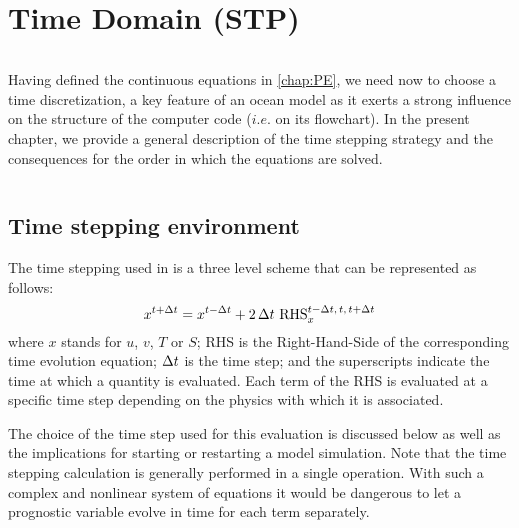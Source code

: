 \documentclass[../tex_main/NEMO_manual]{subfiles}
\begin{document}
\chapter{Time Domain (STP) }
\label{chap:STP}
\minitoc





\newpage
$\ $\newline    %


Having defined the continuous equations in \autoref{chap:PE}, we need now to choose 
a time discretization, a key feature of an ocean model as it exerts a strong influence  
on the structure of the computer code ($i.e.$ on its flowchart). 
In the present chapter, we provide a general description of the \NEMO 
time stepping strategy and the consequences for the order in which the equations are
solved.

$\ $\newline    %
\section{Time stepping environment}
\label{sec:STP_environment}

The time stepping used in \NEMO is a three level scheme that can be 
represented as follows:
\begin{equation} \label{eq:STP}
   x^{t+\Delta t} = x^{t-\Delta t} + 2 \, \Delta t \  \text{RHS}_x^{t-\Delta t,\,t,\,t+\Delta t}
\end{equation} 
where $x$ stands for $u$, $v$, $T$ or $S$; RHS is the Right-Hand-Side of the 
corresponding time evolution equation; $\Delta t$ is the time step; and the 
superscripts indicate the time at which a quantity is evaluated. Each term of the 
RHS is evaluated at a specific time step depending on the physics with which 
it is associated. 

The choice of the time step used for this evaluation is discussed below as 
well as the implications for starting or restarting a model 
simulation. Note that the time stepping calculation is generally performed in a single 
operation. With such a complex and nonlinear system of equations it would be 
dangerous to let a prognostic variable evolve in time for each term separately.
\end{document}

